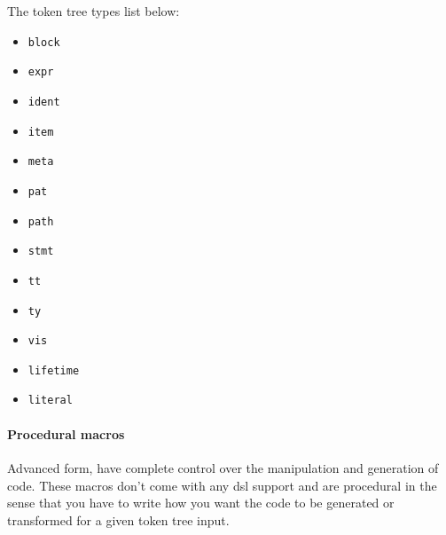 The token tree types list below:
\begin{itemize}
	\item \verb!block!
	\item \verb!expr!
	\item \verb!ident!
	\item \verb!item!
	\item \verb!meta!
	\item \verb!pat!
	\item \verb!path!
	\item \verb!stmt!
	\item \verb!tt!
	\item \verb!ty!
	\item \verb!vis!
	\item \verb!lifetime!
	\item \verb!literal!
\end{itemize}

\paragraph{Procedural macros}
Advanced form, have complete control over the manipulation and generation of 
code. These macros don't come with any \gls{dsl} support and are procedural in 
the sense that you have to write how you want the code to be generated or
transformed for a given token tree input.


